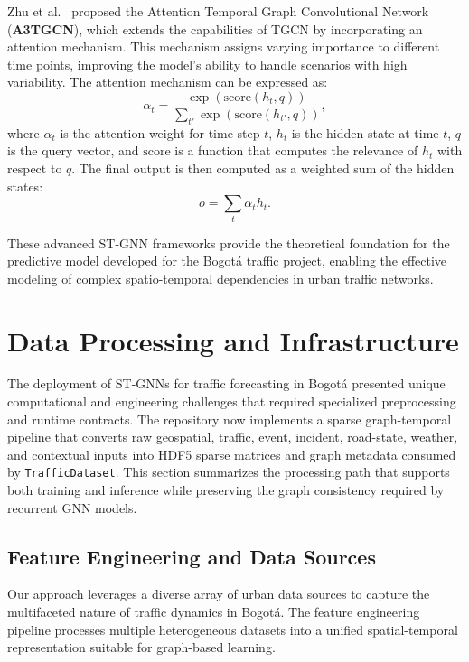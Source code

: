\documentclass[11pt, a4paper]{article}
\begin{document}
Zhu et al.~\cite{zhu_a3tgcn} proposed the Attention Temporal Graph Convolutional Network (\textbf{A3TGCN}), which extends the capabilities of TGCN by incorporating an attention mechanism. This mechanism assigns varying importance to different time points, improving the model's ability to handle scenarios with high variability. The attention mechanism can be expressed as:
\begin{equation}
  \alpha_t = \frac{\exp\left(\text{score}(h_t, q)\right)}{\sum_{t'} \exp\left(\text{score}(h_{t'}, q)\right)},
\end{equation}
where \( \alpha_t \) is the attention weight for time step \( t \), \( h_t \) is the hidden state at time \( t \), \( q \) is the query vector, and \( \text{score} \) is a function that computes the relevance of \( h_t \) with respect to \( q \). The final output is then computed as a weighted sum of the hidden states:
\begin{equation}
  o = \sum_t \alpha_t h_t.
\end{equation}

These advanced ST-GNN frameworks provide the theoretical foundation for the predictive model developed for the Bogotá traffic project, enabling the effective modeling of complex spatio-temporal dependencies in urban traffic networks.

\section{Data Processing and Infrastructure}

The deployment of ST-GNNs for traffic forecasting in Bogotá presented unique computational and engineering challenges that required specialized preprocessing and runtime contracts. The repository now implements a sparse graph-temporal pipeline that converts raw geospatial, traffic, event, incident, road-state, weather, and contextual inputs into HDF5 sparse matrices and graph metadata consumed by \texttt{TrafficDataset}. This section summarizes the processing path that supports both training and inference while preserving the graph consistency required by recurrent GNN models.

\subsection{Feature Engineering and Data Sources}

Our approach leverages a diverse array of urban data sources to capture the multifaceted nature of traffic dynamics in Bogotá. The feature engineering pipeline processes multiple heterogeneous datasets into a unified spatial-temporal representation suitable for graph-based learning.
\end{document}
